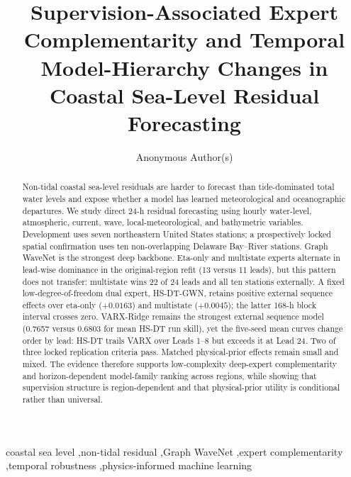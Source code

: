\documentclass[final,5p,times,twocolumn]{elsarticle}
\begin{document}
\raggedbottom
\begin{frontmatter}

\title{Supervision-Associated Expert Complementarity and Temporal Model-Hierarchy Changes in Coastal Sea-Level Residual Forecasting}

\author[anon]{Anonymous Author(s)}
\address[anon]{Affiliation withheld for double-anonymous review}

\begin{abstract}
Non-tidal coastal sea-level residuals are harder to forecast than tide-dominated total water levels and expose whether a model has learned meteorological and oceanographic departures. We study direct 24-h residual forecasting using hourly water-level, atmospheric, current, wave, local-meteorological, and bathymetric variables. Development uses seven northeastern United States stations; a prospectively locked spatial confirmation uses ten non-overlapping Delaware Bay--River stations. Graph WaveNet is the strongest deep backbone. Eta-only and multistate experts alternate in lead-wise dominance in the original-region refit (13 versus 11 leads), but this pattern does not transfer: multistate wins 22 of 24 leads and all ten stations externally. A fixed low-degree-of-freedom dual expert, HS-DT-GWN, retains positive external sequence effects over eta-only ($+0.0163$) and multistate ($+0.0045$); the latter 168-h block interval crosses zero. VARX-Ridge remains the strongest external sequence model (0.7657 versus 0.6803 for mean HS-DT run skill), yet the five-seed mean curves change order by lead: HS-DT trails VARX over Leads 1--8 but exceeds it at Lead 24. Two of three locked replication criteria pass. Matched physical-prior effects remain small and mixed. The evidence therefore supports low-complexity deep-expert complementarity and horizon-dependent model-family ranking across regions, while showing that supervision structure is region-dependent and that physical-prior utility is conditional rather than universal.
\end{abstract}

\begin{keyword}
coastal sea level \sep non-tidal residual \sep Graph WaveNet \sep expert complementarity \sep temporal robustness \sep physics-informed machine learning
\end{keyword}
\end{frontmatter}
\end{document}
